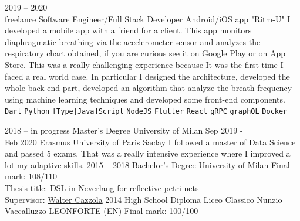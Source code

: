 \documentclass[9pt]{developercv} %
\begin{document}
\begin{entrylist}
	\entry
	{2019 -- 2020\\\footnotesize{freelance}}
	{Software Engineer/Full Stack Developer}
	{Android/iOS app "Ritm-U"}
	{
		I developed a mobile app with a friend for a client. This app
		monitors diaphragmatic breathing via the accelerometer sensor
		and analyzes the respiratory chart obtained, if you are curious see
		it on \href{https://play.google.com/store/apps/details?id=com.ritmu.app}{Google Play}
		or on \href{https://apps.apple.com/us/app/id1514766559}{App Store}. This was a really challenging experience
		because It was the first time I faced a real world case. In particular
		I designed the architecture, developed the whole back-end part,
		developed an algorithm that analyze the breath frequency using machine learning techniques and developed some front-end components.
		\\
		\texttt{Dart}\slashsep
		\texttt{Python}\slashsep
		\texttt{[Type|Java]Script}\slashsep
		\texttt{NodeJS}\slashsep
		\texttt{Flutter}\slashsep
		\texttt{React}\slashsep
		\texttt{gRPC}\slashsep
		\texttt{graphQL}\slashsep
		\texttt{Docker}
	}
\end{entrylist}



\begin{entrylist}
	\entry
	{2018 -- in progress}
	{Master's Degree}
	{University of Milan}
	{}
	\entry
	{Sep 2019 - \\Feb 2020}
	{Erasmus}
	{University of Paris Saclay}
	{
		I followed a master of Data Science and passed 5 exams.
		That was a really intensive experience where I improved a lot my adaptive skills.
	}
	\entry
	{2015 -- 2018}
	{Bachelor's Degree}
	{University of Milan}
	{
		Final mark: 108/110\\
		Thesis title: DSL in Neverlang for reflective petri nets\\
		Supervisor: \href{https://cazzola.di.unimi.it}{Walter Cazzola}
	}
	\entry
	{2014}
	{High School Diploma}
	{Liceo Classico Nunzio Vaccalluzzo LEONFORTE (EN)}
	{
		Final mark: 100/100\\
	}
\end{entrylist}

\end{document}
